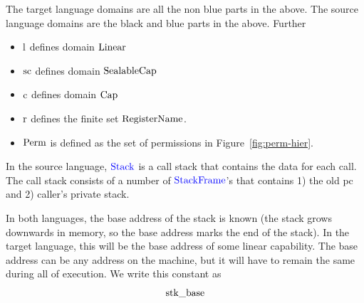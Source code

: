 \documentclass[a4paper]{article}
\begin{document}
The target language domains are all the non blue parts in the above. The source language domains are the black and blue parts in the above. Further
\begin{itemize}
\item $\mathrm{l}$ defines domain $\mathrm{Linear}$
\item $\mathrm{sc}$ defines domain $\mathrm{SealableCap}$
\item $\mathrm{c}$ defines domain $\mathrm{Cap}$
\item $\mathrm{r}$ defines the finite set $\mathrm{RegisterName}$. 
\item $\mathrm{Perm}$ is defined as the set of permissions in Figure~\ref{fig:perm-hier}.
\end{itemize}

In the source language, ${\color{blue} \mathrm{Stack}}$ is a call stack that contains the data for each call. The call stack consists of a number of ${\color{blue} \mathrm{StackFrame}}$'s that contains 1) the old pc and 2) caller's private stack.

 In both languages, the base address of the stack is known (the stack grows downwards in memory, so the base address marks the end of the stack). In the target language, this will be the base address of some linear capability. The base address can be any address on the machine, but it will have to remain the same during all of execution. We write this constant as
\[
  \mathrm{stk\_base}
\]
\end{document}
